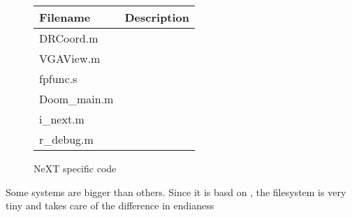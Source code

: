 \par


 \begin{figure}[H]
\centering  
\begin{tabularx}{\textwidth}{ L{0.4} L{0.6} }
  \toprule
  \textbf{Filename} & \textbf{Description}\\
  \toprule 
DRCoord.m  & \\
VGAView.m & \\
fpfunc.s & \\
Doom\_main.m  & \\
i\_next.m  & \\
r\_debug.m & \\
   \toprule
\end{tabularx}
\caption{NeXT specific code}
\end{figure}

Some systems are bigger than others. Since it is basd on , the filesystem is very tiny and takes care of the difference in endianess
